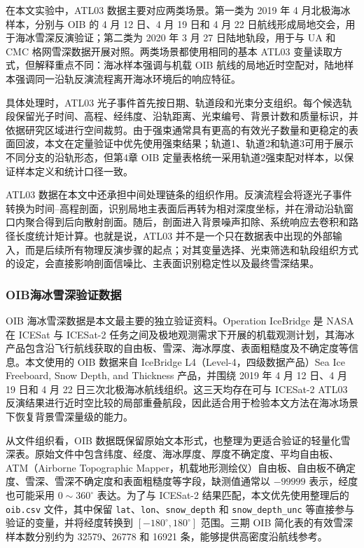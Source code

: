 在本文实验中，ATL03 数据主要对应两类场景。第一类为 2019 年 4 月北极海冰样本，分别与 OIB 的 4 月 12 日、4 月 19 日和 4 月 22 日航线形成局地交会，用于海冰雪深反演验证；第二类为 2020 年 3 月 27 日陆地轨段，用于与 UA 和 CMC 格网雪深数据开展对照。两类场景都使用相同的基本 ATL03 变量读取方式，但解释重点不同：海冰样本强调与机载 OIB 航线的局地近时空配对，陆地样本强调同一沿轨反演流程离开海冰环境后的响应特征。

具体处理时，ATL03 光子事件首先按日期、轨道段和光束分支组织。每个候选轨段保留光子时间、高程、经纬度、沿轨距离、光束编号、背景计数和质量标识，并依据研究区域进行空间裁剪。由于强束通常具有更高的有效光子数量和更稳定的表面回波，本文在定量验证中优先使用强束结果；轨道1、轨道2和轨道3可用于展示不同分支的沿轨形态，但第4章 OIB 定量表格统一采用轨道2强束配对样本，以保证样本定义和统计口径一致。

ATL03 数据在本文中还承担中间处理链条的组织作用。反演流程会将逐光子事件转换为时间--高程剖面，识别局地主表面后再转为相对深度坐标，并在滑动沿轨窗口内聚合得到后向散射剖面。随后，剖面进入背景噪声扣除、系统响应去卷积和路径长度统计矩计算。也就是说，ATL03 并不是一个只在数据表中出现的外部输入，而是后续所有物理反演步骤的起点；对其变量选择、光束筛选和轨段组织方式的设定，会直接影响剖面信噪比、主表面识别稳定性以及最终雪深结果。

\subsubsection{OIB海冰雪深验证数据}
OIB 海冰雪深数据是本文最主要的独立验证资料。Operation IceBridge 是 NASA 在 ICESat 与 ICESat-2 任务之间及极地观测需求下开展的机载观测计划，其海冰产品包含沿飞行航线获取的自由板、雪深、海冰厚度、表面粗糙度及不确定度等信息\citep{NSIDC_IDCSI4}。本文使用的 OIB 数据来自 IceBridge L4（Level-4，四级数据产品）Sea Ice Freeboard, Snow Depth, and Thickness 产品，并围绕 2019 年 4 月 12 日、4 月 19 日和 4 月 22 日三次北极海冰航线组织。这三天均存在可与 ICESat-2 ATL03 反演结果进行近时空比较的局部重叠航段，因此适合用于检验本文方法在海冰场景下恢复背景雪深量级的能力。

从文件组织看，OIB 数据既保留原始文本形式，也整理为更适合验证的轻量化雪深表。原始文件中包含纬度、经度、海冰厚度、厚度不确定度、平均自由板、ATM（Airborne Topographic Mapper，机载地形测绘仪）自由板、自由板不确定度、雪深、雪深不确定度和表面粗糙度等字段，缺测值通常以 \(-99999\) 表示，经度也可能采用 \(0\sim360^\circ\) 表达。为了与 ICESat-2 结果匹配，本文优先使用整理后的 \texttt{oib.csv} 文件，其中保留 \texttt{lat}、\texttt{lon}、\texttt{snow\_depth} 和 \texttt{snow\_depth\_unc} 等直接参与验证的变量，并将经度转换到 \([-180^\circ,180^\circ]\) 范围。三期 OIB 简化表的有效雪深样本数分别约为 32579、26778 和 16921 条，能够提供高密度沿航线参考。

